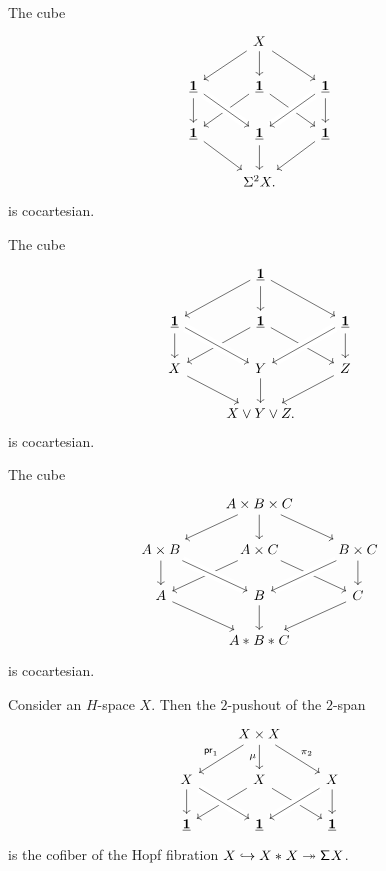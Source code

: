 \begin{cor}
The cube
\begin{equation*}
\begin{tikzcd}
& X \arrow[dl] \arrow[d] \arrow[dr] \\
\unit \arrow[d] & \unit \arrow[dl] \arrow[dr] & \unit \arrow[d] \\
\unit \arrow[dr] & \unit \arrow[d] \arrow[from=ul,crossing over] \arrow[from=ur,crossing over] & \unit \arrow[dl] \\
& \Sigma^2 X.
\end{tikzcd}
\end{equation*}
is cocartesian.
\end{cor}

\begin{cor}
The cube
\begin{equation*}
\begin{tikzcd}
& \unit \arrow[dl] \arrow[d] \arrow[dr] \\
\unit \arrow[d] & \unit \arrow[dl] \arrow[dr] & \unit \arrow[d] \\
X \arrow[dr] & Y \arrow[d] \arrow[from=ul,crossing over] \arrow[from=ur,crossing over] & Z \arrow[dl] \\
& X\vee Y\vee Z.
\end{tikzcd}
\end{equation*}
is cocartesian.
\end{cor}

\begin{cor}
The cube
\begin{equation*}
\begin{tikzcd}
& A\times B \times C \arrow[dl] \arrow[d] \arrow[dr] \\
A\times B \arrow[d] & A\times C \arrow[dl] \arrow[dr] & B\times C \arrow[dl,crossing over] \arrow[d] \\
A \arrow[dr] & B \arrow[d] \arrow[from=ul,crossing over] & C  \arrow[dl] \\
& \join{A}{\join{B}{C}}
\end{tikzcd}
\end{equation*}
is cocartesian.
\end{cor}

\begin{cor}
Consider an $H$-space $X$. Then the $2$-pushout of the $2$-span
\begin{equation*}
\begin{tikzcd}
& X \times X \arrow[dl,swap,"\proj 1"] \arrow[d,swap,"\mu"] \arrow[dr,"\pi_2"] \\
X \arrow[d] & X \arrow[dl] \arrow[dr] & X \arrow[dl,crossing over] \arrow[d] \\
\unit & \unit \arrow[from=ul,crossing over] & \unit
\end{tikzcd}
\end{equation*}
is the cofiber of the Hopf fibration $X \hookrightarrow {X}\ast_{}{X} \twoheadrightarrow \mathsf{\Sigma}^{} X$. 
\end{cor}

